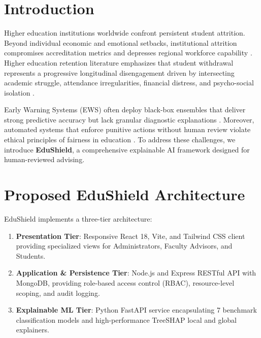 \documentclass[runningheads]{llncs}
\begin{document}
\section{Introduction}
Higher education institutions worldwide confront persistent student attrition. Beyond individual economic and emotional setbacks, institutional attrition compromises accreditation metrics and depresses regional workforce capability \cite{tinto2012completing}. Higher education retention literature emphasizes that student withdrawal represents a progressive longitudinal disengagement driven by intersecting academic struggle, attendance irregularities, financial distress, and psycho-social isolation \cite{tinto1975dropout,bean1980dropouts}.

Early Warning Systems (EWS) often deploy black-box ensembles that deliver strong predictive accuracy but lack granular diagnostic explanations \cite{romero2020educational}. Moreover, automated systems that enforce punitive actions without human review violate ethical principles of fairness in education \cite{selwyn2019should}. To address these challenges, we introduce \textbf{EduShield}, a comprehensive explainable AI framework designed for human-reviewed advising.

\section{Proposed EduShield Architecture}
EduShield implements a three-tier architecture:
\begin{enumerate}
    \item \textbf{Presentation Tier}: Responsive React 18, Vite, and Tailwind CSS client providing specialized views for Administrators, Faculty Advisors, and Students.
    \item \textbf{Application \& Persistence Tier}: Node.js and Express RESTful API with MongoDB, providing role-based access control (RBAC), resource-level scoping, and audit logging.
    \item \textbf{Explainable ML Tier}: Python FastAPI service encapsulating 7 benchmark classification models and high-performance TreeSHAP local and global explainers.
\end{enumerate}
\end{document}
